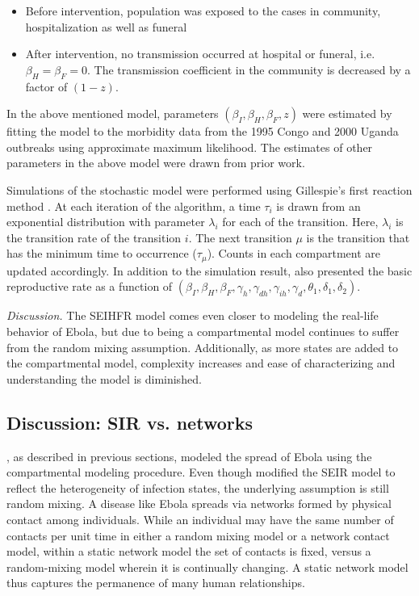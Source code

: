 \documentclass[10pt, journal,onecolumn]{IEEEtran}
\begin{document}
\begin{itemize}
\item Before intervention, population was exposed to the cases in community, hospitalization as well as funeral
\item After intervention, no transmission occurred at hospital or funeral, i.e. $\beta_H = \beta_F = 0$. The transmission coefficient in the community is decreased by a factor of $(1-z)$.
\end{itemize}

In the above mentioned model, parameters $(\beta_I, \beta_H, \beta_F , z)$ were estimated by fitting
the model to the morbidity data from the 1995 Congo and 2000 Uganda outbreaks using approximate maximum
likelihood. The estimates of other parameters in the above model were drawn from prior work.

Simulations of the stochastic model were performed using Gillespie's first reaction method \citep{gillespie1976general}. At each iteration of the algorithm, a time $\tau_i$ is drawn from an exponential distribution with parameter $\lambda_i$ for each of the transition. Here, $\lambda_i$ is the transition rate of the transition $i$. The next transition $\mu$ is the transition that has the minimum time to occurrence ($\tau_\mu$). Counts in each compartment are updated accordingly. In addition to the simulation result,  \citep{legrand2007understanding} also presented the basic reproductive rate as a function of $(\beta_I,\beta_H,\beta_F,\gamma_h,\gamma_{dh},\gamma_{ih},\gamma_d,\theta_1,\delta_1,\delta_2)$.

\textit{Discussion.} The SEIHFR model comes even closer to modeling the real-life behavior of Ebola,
but due to being a compartmental model continues to suffer from the random mixing assumption.
Additionally, as more states are added to the compartmental model, complexity increases and ease of
characterizing and understanding the model is diminished.

\subsection{\textbf{Discussion: SIR \citep{chowell2004basic, legrand2007understanding} vs. networks \citep{newman2002spread}}}

\citep{chowell2004basic, legrand2007understanding}, as described in previous sections, modeled the spread of Ebola using the
compartmental modeling procedure. Even though \citep{legrand2007understanding} modified the
SEIR model to reflect the heterogeneity of infection states, the underlying assumption is still
random mixing. A disease like Ebola spreads via networks formed by physical contact among individuals.
While an individual may have the same number of contacts per unit
time in either a random mixing model or a network contact model, within a static network model the set of
contacts is fixed, versus a random-mixing model wherein it is continually changing.
A static network model thus captures the permanence of many human relationships.
\end{document}
